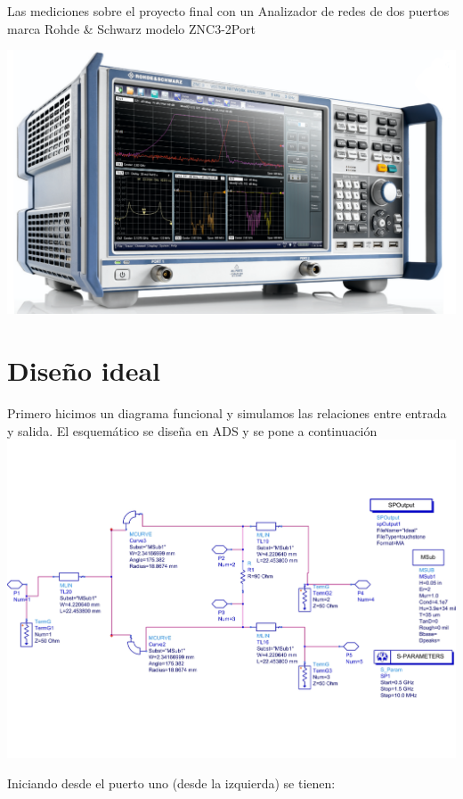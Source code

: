 \documentclass[a4paper, 12pt]{article}
\begin{document}
\begin{minipage}{0.4\linewidth}
  Las mediciones sobre el proyecto final con un Analizador de redes de dos puertos marca Rohde \& Schwarz modelo ZNC3-2Port \cite{RS_ZNC}
\end{minipage}
\begin{minipage}{0.59\linewidth}
  \includegraphics[width=\linewidth]{./img/vna.png}
\end{minipage}

\section*{Diseño ideal}
Primero hicimos un diagrama funcional y simulamos las relaciones entre entrada y salida.
El esquemático se diseña en ADS y se pone a continuación
\includegraphics[width = 0.9\linewidth]{./img/ideal.jpg}

Iniciando desde el puerto uno (desde la izquierda) se tienen:
\end{document}
